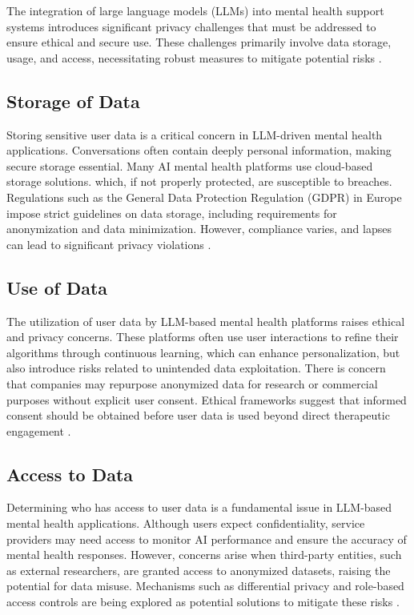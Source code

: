 The integration of large language models (LLMs) into mental health support systems introduces significant privacy challenges that must be addressed to ensure ethical and secure use. These challenges primarily involve data storage, usage, and access, necessitating robust measures to mitigate potential risks \cite{Volkmer2024-xw, Iwaya2022-ut}.
\subsection{Storage of Data}
Storing sensitive user data is a critical concern in LLM-driven mental health applications. Conversations often contain deeply personal information, making secure storage essential. Many AI mental health platforms use cloud-based storage solutions. which, if not properly protected, are susceptible to breaches. Regulations such as the General Data Protection Regulation (GDPR) in Europe impose strict guidelines on data storage, including requirements for anonymization and data minimization. However, compliance varies, and lapses can lead to significant privacy violations \cite{Iwaya2022-ut}.
\subsection{Use of Data}
The utilization of user data by LLM-based mental health platforms raises ethical and privacy concerns. These platforms often use user interactions to refine their algorithms through continuous learning, which can enhance personalization, but also introduce risks related to unintended data exploitation. There is concern that companies may repurpose anonymized data for research or commercial purposes without explicit user consent. Ethical frameworks suggest that informed consent should be obtained before user data is used beyond direct therapeutic engagement \cite{Guo2024-ba}.
\subsection{Access to Data}
Determining who has access to user data is a fundamental issue in LLM-based mental health applications. Although users expect confidentiality, service providers may need access to monitor AI performance and ensure the accuracy of mental health responses. However, concerns arise when third-party entities, such as external researchers, are granted access to anonymized datasets, raising the potential for data misuse. Mechanisms such as differential privacy and role-based access controls are being explored as potential solutions to mitigate these risks \cite{Iwaya2022-ut}.
